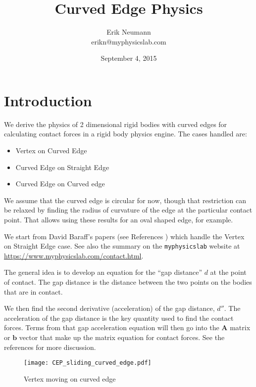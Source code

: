 \documentclass[final]{article}
\title{Curved Edge Physics}
\author{Erik Neumann\\
erikn@myphysicslab.com}
\date{September 4, 2015}
\begin{document}
\maketitle



\section{Introduction}

We derive the physics of 2 dimensional rigid bodies with curved edges for calculating
contact forces in a rigid body physics engine. The cases handled are:

\begin{itemize}
  \item Vertex on Curved Edge
  \item Curved Edge on Straight Edge
  \item Curved Edge on Curved edge
\end{itemize}

We assume that the curved edge is circular for now, though that restriction can be
relaxed by finding the radius of curvature of the edge at the particular contact point.
That allows using these results for an oval shaped edge, for example.

We start from David Baraff's papers (see References \cite{dB94, dB97}) which handle the
Vertex on Straight Edge case. See also the summary on the \texttt{myphysicslab} website
at \url{https://www.myphysicslab.com/contact.html}.

The general idea is to develop an equation for the ``gap distance'' $d$ at the point of
contact. The gap distance is the distance between the two points on the bodies that are
in contact.

We then find the second derivative (acceleration) of the gap distance, $d''$. The
acceleration of the gap distance is the key quantity used to find the contact forces.
Terms from that gap acceleration equation will then go into the $\mathbf{A}$ matrix or
$\mathbf{b}$ vector that make up the matrix equation for contact forces. See the
references for more discussion.

\begin{figure}[ht]
    \centering
    \texttt{[image: CEP\_sliding\_curved\_edge.pdf]}
    \caption{Vertex moving on curved edge}
    \label{fig:sliding_curved_edge}
\end{figure}
\end{document}
